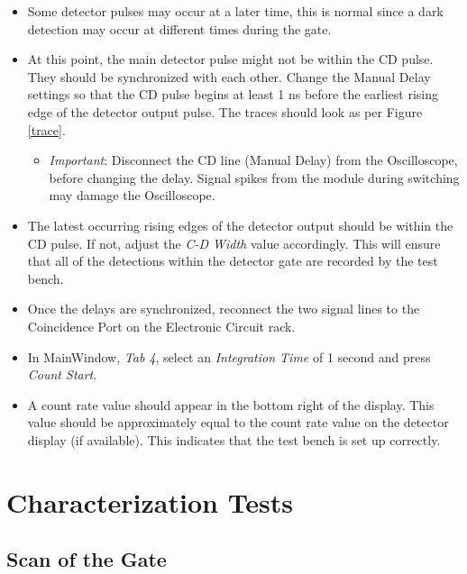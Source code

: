 \documentclass{article}
\begin{document}
\begin{itemize}
\item
Some detector pulses may occur at a later time, this is normal since a dark detection may occur at different times during the gate.
\item
At this point, the main detector pulse might not be within the CD pulse. They should be synchronized with each other. Change the Manual Delay settings so that the CD pulse begins at least 1 ns before the earliest rising edge of the detector output pulse. The traces should look as per Figure \ref{trace}.
\begin{itemize}
\item
\emph{Important}: Disconnect the CD line (Manual Delay) from the Oscilloscope, before changing the delay. Signal spikes from the module during switching may damage the Oscilloscope. 
\end{itemize}

\item
The latest occurring rising edges of the detector output should be within the CD pulse. If not, adjust the \emph{C-D Width} value accordingly. This will ensure that all of the detections within the detector gate are recorded by the test bench.

\item
Once the delays are synchronized, reconnect the two signal lines to the Coincidence Port on the Electronic Circuit rack.

\item
In MainWindow, \emph{Tab 4}, select an \emph{Integration Time} of 1 second and press \emph{Count Start}.

\item 
A count rate value should appear in the bottom right of the display. This value should be approximately equal to the count rate value on the detector display (if available). This indicates that the test bench is set up correctly. 



\end{itemize} 
 
 
\section{Characterization Tests}

\subsection{Scan of the Gate}
\end{document}
